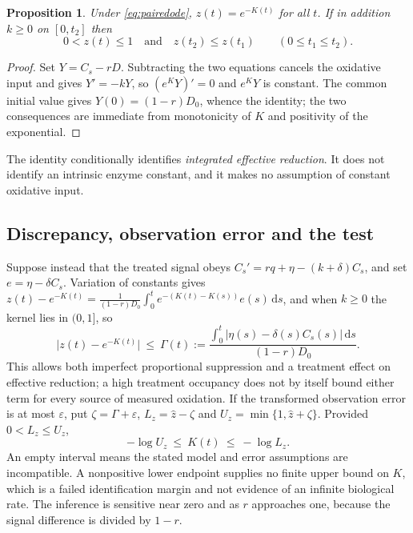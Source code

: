 \documentclass[11pt,a4paper]{article}
\theoremstyle{plain}
\newtheorem{proposition}[theorem]{Proposition}
\theoremstyle{definition}
\theoremstyle{remark}
\newcommand{\dd}{\mathrm d}
\begin{document}
\begin{proposition}\label{prop:identity}
Under \eqref{eq:pairedode}, $z(t)=e^{-K(t)}$ for all $t$. If in addition
$k\ge0$ on $[0,t_2]$ then
\begin{equation}\label{eq:monotone}
0<z(t)\le1\quad\text{and}\quad z(t_2)\le z(t_1)\qquad(0\le t_1\le t_2).
\end{equation}
\end{proposition}

\begin{proof}
Set $Y=C_s-rD$. Subtracting the two equations cancels the oxidative input and
gives $Y'=-kY$, so $(e^KY)'=0$ and $e^{K}Y$ is constant. The common initial
value gives $Y(0)=(1-r)D_0$, whence the identity; the two consequences are
immediate from monotonicity of $K$ and positivity of the exponential.
\end{proof}

The identity conditionally identifies \emph{integrated effective reduction}. It
does not identify an intrinsic enzyme constant, and it makes no assumption of
constant oxidative input.

\subsection{Discrepancy, observation error and the test}
Suppose instead that the treated signal obeys
$C_s'=rq+\eta-(k+\delta)C_s$, and set $e=\eta-\delta C_s$. Variation of
constants gives
$z(t)-e^{-K(t)}=\frac{1}{(1-r)D_0}\int_0^te^{-(K(t)-K(s))}e(s)\,\dd s$,
and when $k\ge0$ the kernel lies in $(0,1]$, so
\begin{equation}\label{eq:gamma}
\bigl|z(t)-e^{-K(t)}\bigr|\ \le\ \Gamma(t)
:=\frac{\int_0^t|\eta(s)-\delta(s)C_s(s)|\,\dd s}{(1-r)D_0} .
\end{equation}
This allows both imperfect proportional suppression and a treatment effect on
effective reduction; a high treatment occupancy does not by itself bound either
term for every source of measured oxidation. If the transformed observation
error is at most $\varepsilon$, put $\zeta=\Gamma+\varepsilon$,
$L_z=\hat z-\zeta$ and $U_z=\min\{1,\hat z+\zeta\}$. Provided
$0<L_z\le U_z$,
\begin{equation}\label{eq:loginterval}
-\log U_z\ \le\ K(t)\ \le\ -\log L_z .
\end{equation}
An empty interval means the stated model and error assumptions are
incompatible. A nonpositive lower endpoint supplies no finite upper bound on
$K$, which is a failed identification margin and not evidence of an infinite
biological rate. The inference is sensitive near zero and as $r$ approaches
one, because the signal difference is divided by $1-r$.
\end{document}

